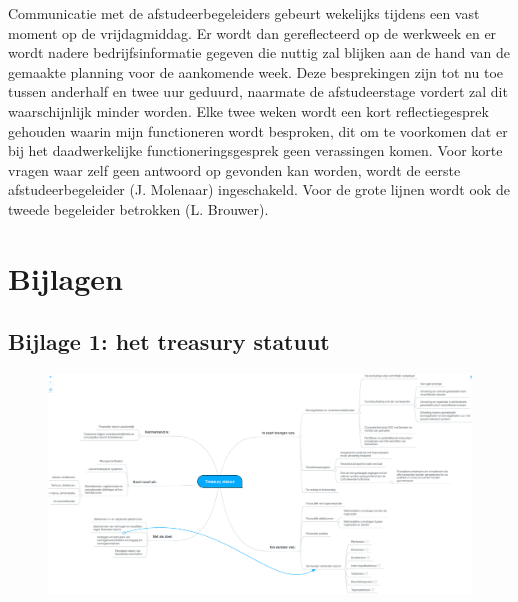 \documentclass[10pt,a4paper,oneside]{report}
\begin{document}
Communicatie met de afstudeerbegeleiders gebeurt wekelijks tijdens een vast moment op de vrijdagmiddag. Er wordt dan gereflecteerd op de werkweek en er wordt nadere bedrijfsinformatie gegeven die nuttig zal blijken aan de hand van de gemaakte planning voor de aankomende week. Deze besprekingen zijn tot nu toe tussen anderhalf en twee uur geduurd, naarmate de afstudeerstage vordert zal dit waarschijnlijk minder worden. Elke twee weken wordt een kort reflectiegesprek gehouden waarin mijn functioneren wordt besproken, dit om te voorkomen dat er bij het daadwerkelijke functioneringsgesprek geen verassingen komen. Voor korte vragen waar zelf geen antwoord op gevonden kan worden, wordt de eerste afstudeerbegeleider (J. Molenaar) ingeschakeld. Voor de grote lijnen wordt ook de tweede begeleider betrokken (L. Brouwer).


\printbibliography
{}

\newpage
\section*{Bijlagen}
\subsection*{\hypertarget{bij:treasury}{Bijlage 1}: het treasury statuut}
\begin{figure}[ht]
    \centering
    \includegraphics[angle=90,scale=0.245]{treasury}
    \label{fig:mmtreasury}
\end{figure}

\newpage
\end{document}
